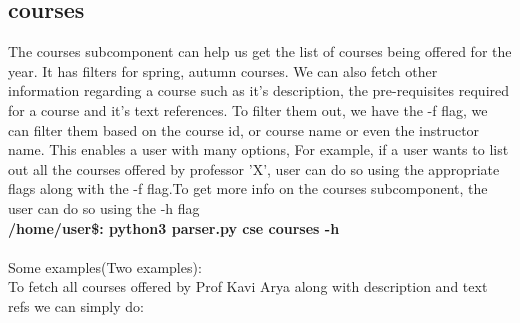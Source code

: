\documentclass[12pt, letterpaper, twoside]{article}
\begin{document}
\subsection{courses}
The courses subcomponent can help us get the list of courses being offered for the year. It has filters for spring, autumn courses.
We can also fetch other information regarding a course such as it's description, the pre-requisites required for a course and it's text references.
To filter them out, we have the -f flag, we can filter them based on the course id, or course name or even the instructor name. This enables a user
with many options, For example, if a user wants to list out all the courses offered by professor 'X', user can do so using the appropriate flags
along with the -f flag.To get more info on the courses subcomponent, the user can do so using the -h flag\\
\textbf{/home/user\$: python3 parser.py cse courses -h}\\
\\
Some examples(Two examples):\\
To fetch all courses offered by Prof Kavi Arya along with description and text refs we can simply do:
\end{document}
